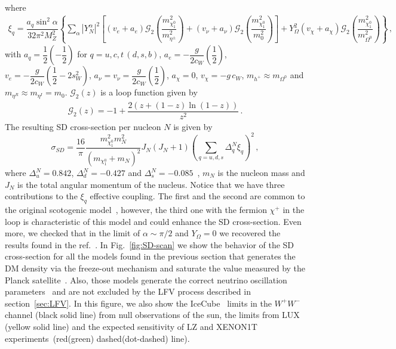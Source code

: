 \documentclass[12pt,letterpaper]{article}
\begin{document}
%
where
%
\begin{align}
\label{eq:xiq}
\xi_q = \dfrac{a_q \sin^2\alpha }{32\pi^2M_Z^2}
\left\{
\sum_{\alpha}|Y_N^{\alpha} |^2\left[
(v_{e}+a_{e}) \mathcal{G}_2\left(\dfrac{m_{\chi^0_1}^2}{m_{\eta^{\pm}}^2}\right) 
+ (v_{\nu}+a_{\nu}) \mathcal{G}_2\left(\dfrac{m_{\chi^0_1}^2}{m_0^2}\right) 
\right]
+ 
Y_{\Omega}^2(v_{\chi}+a_{\chi}) \mathcal{G}_2\left(\dfrac{m_{\chi^0_1}^2}{m_{\Omega^0}^2}\right) 
\right\}\,,
\end{align}
%
with $a_q = \dfrac{1}{2} \left(-\dfrac{1}{2}\right)$ for $q=u,c,t\, (d,s,b)$, $a_{e} = -\dfrac{g}{2c_W}\left(\dfrac{1}{2}\right)$, $v_{e} = -\dfrac{g}{2c_W}\left(\dfrac{1}{2}-2s^2_W \right)$, $a_\nu = v_\nu = \dfrac{g}{2c_W}\left(\dfrac{1}{2}\right)$, $a_{\chi} = 0$, $v_{\chi} = -g\, c_W$, $m_{h^+}\approx m_{\Omega^0}$ and $ m_{\eta^R}\approx m_{\eta^I}=m_0$. $\mathcal{G}_2(z)$ is a loop function given by
%
\begin{align}
\label{eq:G2}
\mathcal{G}_2(z) = -1 + \dfrac{2(z+(1-z)\ln(1-z))}{z^2}\,.
\end{align}
%
The resulting SD cross-section per nucleon  $N$  is given by
%
\begin{equation}
\label{eq:SD}
\sigma_{SD}=\dfrac{16}{\pi}\dfrac{m_{\chi^0_1}^2m_N^2}{(m_{\chi^0_1}+m_N)^2}J_N(J_N+1)\left(\sum_{q=u,d,s}\Delta_q^N \xi_q\right)^2 \,,
\end{equation}
where $\Delta_u^N=0.842$, $\Delta_d^N= -0.427$ and $\Delta_s^N= -0.085$~\cite{Airapetian:2006vy}, $m_N$ is the nucleon mass and $J_N$ is the  total angular momentum of the nucleus. 
Notice that we have three contributions to the $\xi_q$ effective coupling. 
The first and the second are common to the original scotogenic model~\cite{Ma:2006km}, however, the third one with the fermion $\chi^{+}$ in the loop is characteristic of this model and could enhance the SD cross-section. Even more, we checked that in the limit of $\alpha\sim\pi/2$ and $Y_{\Omega}=0$ we recovered the results found in the ref.~\cite{Ibarra:2016dlb}.
In Fig.~\ref{fig:SD-scan} we show the behavior of the SD cross-section for all the models found in the previous section that generates the DM density via the freeze-out mechanism and saturate the value measured by the Planck satellite~\cite{Aghanim:2018eyx}. Also, those models generate the correct neutrino oscillation parameters~\cite{deSalas:2017kay} and are not excluded by the LFV process described in section~\ref{sec:LFV}. 
In this figure, we also show the IceCube~\cite{2013PhRvL.110m1302A} limits in the $W^+W^-$ channel (black solid line) from null observations of the sun, the limits from LUX~\cite{Akerib:2016lao} (yellow solid line) and the expected sensitivity of LZ and XENON1T experiments~\cite{Cushman:2013zza}(red(green) dashed(dot-dashed) line).
\end{document}
